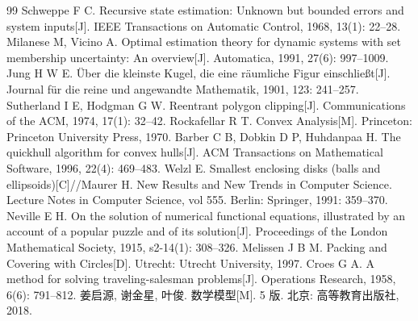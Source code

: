 \documentclass[withoutpreface, bwprint]{cumcmthesis}
\begin{document}
\begin{thebibliography}{99}
  \small
   Schweppe F C. Recursive state estimation: Unknown but bounded errors
    and system inputs[J]. IEEE Transactions on Automatic Control, 1968, 13(1): 22--28.
   Milanese M, Vicino A. Optimal estimation theory for dynamic systems with
    set membership uncertainty: An overview[J]. Automatica, 1991, 27(6): 997--1009.
   Jung H W E. Über die kleinste Kugel, die eine räumliche Figur einschließt[J].
    Journal für die reine und angewandte Mathematik, 1901, 123: 241--257.
   Sutherland I E, Hodgman G W. Reentrant polygon clipping[J].
    Communications of the ACM, 1974, 17(1): 32--42.
   Rockafellar R T. Convex Analysis[M]. Princeton: Princeton University Press, 1970.
   Barber C B, Dobkin D P, Huhdanpaa H. The quickhull algorithm for convex hulls[J].
    ACM Transactions on Mathematical Software, 1996, 22(4): 469--483.
   Welzl E. Smallest enclosing disks (balls and ellipsoids)[C]//Maurer H.
    New Results and New Trends in Computer Science. Lecture Notes in Computer Science, vol 555.
    Berlin: Springer, 1991: 359--370.
   Neville E H. On the solution of numerical functional equations, illustrated by
    an account of a popular puzzle and of its solution[J]. Proceedings of the London Mathematical
    Society, 1915, s2-14(1): 308--326.
   Melissen J B M. Packing and Covering with Circles[D]. Utrecht: Utrecht University, 1997.
   Croes G A. A method for solving traveling-salesman problems[J].
    Operations Research, 1958, 6(6): 791--812.
   姜启源, 谢金星, 叶俊. 数学模型[M]. 5 版. 北京: 高等教育出版社, 2018.
\end{thebibliography}
\end{document}
